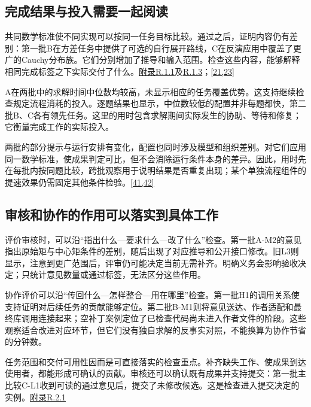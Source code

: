 \subsection[完成结果与投入需要一起阅读]{\texorpdfstring{\protect\hypertarget{section-6-1}{}完成结果与投入需要一起阅读}{完成结果与投入需要一起阅读}}
共同数学标准使不同实现可以按同一任务目标比较。通过之后，证明内容仍有差别：第一批B在方差任务中提供了可选的自行展开路线，C在反演应用中覆盖了更广的Cauchy分布族。它们分别增加了推导和输入范围。检查这些内容，能够解释相同完成标签之下实际交付了什么。\href{zh-appendix.pdf\#r1-1}{附录R.1.1}及\href{zh-appendix.pdf\#r1-3}{R.1.3}；\hyperlink{ref-21}{\mbox{[21,23]}}

A在两批中的求解时间中位数均较高，未显示相应的任务覆盖优势。这支持继续检查规定流程消耗的投入。逐题结果也显示，中位数较低的配置并非每题都快，第二批B、C各有领先任务。这里的用时包含求解期间实际发生的协助、等待和修复；它衡量完成工作的实际投入。

两批的部分提示与运行安排有变化，配置也同时涉及模型和组织差别。对它们应用同一数学标准，使成果判定可比，但不会消除运行条件本身的差异。因此，用时先在每批内按同题比较，跨批观察用于说明结果是否重复出现；某个单独流程组件的提速效果仍需固定其他条件检验。\hyperlink{ref-41}{\mbox{[41,42]}}

\subsection[审核和协作的作用可以落实到具体工作]{\texorpdfstring{\protect\hypertarget{section-6-2}{}审核和协作的作用可以落实到具体工作}{审核和协作的作用可以落实到具体工作}}
评价审核时，可以沿“指出什么—要求什么—改了什么”检查。第一批A-M2的意见指出原始矩与中心矩条件的差别，随后出现了对应推导和公开接口修改。旧L3则显示，注意到更广范围后，评审仍可能决定当前无需补齐。明确义务会影响验收决定；只统计意见数量或通过标签，无法区分这些作用。

协作评价可以沿“传回什么—怎样整合—用在哪里”检查。第一批H1的调用关系使支持证明对后续任务的贡献能够定位。第二批B-M1则将意见送达、作者适配和最终库调用连接起来；空补丁案例定位了已检查代码尚未进入作者文件的阶段。这些观察适合改进对应环节，但它们没有独自求解的反事实对照，不能换算为协作节省的分钟数。

任务范围和交付可用性因而是可直接落实的检查重点。补齐缺失工作、使成果到达使用者，都能形成可确认的贡献。审核还可以确认既有成果并支持提交：第一批主比较C-L1收到可读的通过意见后，提交了未修改候选。这是检查进入提交决定的实例。\href{zh-appendix.pdf\#r2-1}{附录R.2.1}

